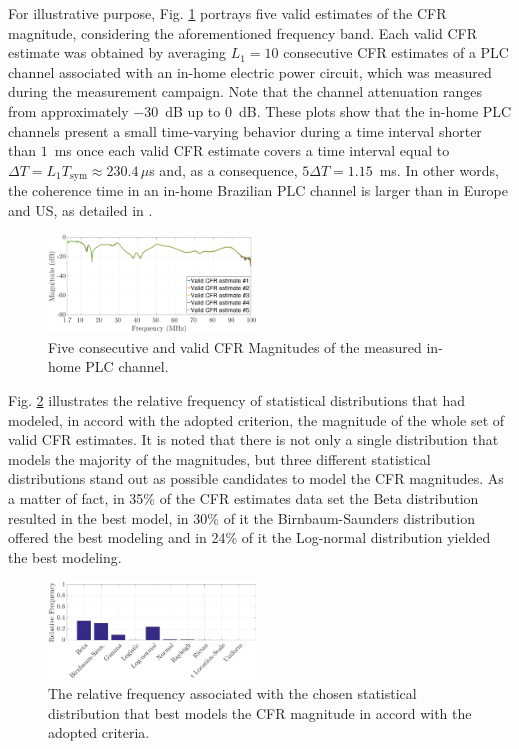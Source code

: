\documentclass[journal]{IEEEtran}
\begin{document}
For illustrative purpose, Fig. \ref{respfreq} portrays five valid estimates of the \ac{CFR} magnitude, considering the aforementioned frequency band. Each valid \ac{CFR} estimate was obtained by averaging  $L_1 = 10$ consecutive \ac{CFR} estimates of a \ac{PLC} channel associated with an in-home electric power circuit, which was measured during the measurement campaign. Note that the channel attenuation ranges from approximately $-30$~dB up to $0$~dB. These plots show that the in-home \ac{PLC} channels present a small time-varying behavior during a time interval shorter than $1$~ms once each valid \ac{CFR} estimate covers a time interval equal to $\Delta T = L_1 T_{\textrm{sym}} \approx 230.4\,\mu$s and, as a consequence, $5\Delta T = 1.15$~ms. In other words, the coherence time in an in-home Brazilian PLC channel is larger than in Europe and US, as detailed in \cite{Thiago:Characterization}.

\begin{figure}[h]
	\centering
	\includegraphics[width=0.49\textwidth]{images/respfreq_1.7.eps}
	\caption{Five consecutive and valid \ac{CFR} Magnitudes of the measured in-home \ac{PLC} channel.}
	\label{respfreq}
\end{figure}

Fig. \ref{MAG_percent} illustrates the relative frequency of statistical distributions that had modeled, in accord with the adopted criterion, the magnitude of the whole set of valid \ac{CFR} estimates. It is noted that there is not only a single distribution that models the majority of the magnitudes, but three different statistical distributions stand out as possible candidates to model the \ac{CFR} magnitudes. As a matter of fact, in 35\% of the \ac{CFR} estimates data set the Beta distribution resulted in the best model, in 30\% of it  the Birnbaum-Saunders distribution offered the best modeling and in 24\% of it the Log-normal distribution yielded the best modeling. 

\begin{figure}[h!]
	\centering
	\includegraphics[width=0.49\textwidth]{images/Mag_percent.eps}
	\caption{The relative frequency associated with the chosen statistical distribution that best models the \ac{CFR} magnitude in accord with the adopted criteria.}
	\label{MAG_percent}
\end{figure}
\end{document}
